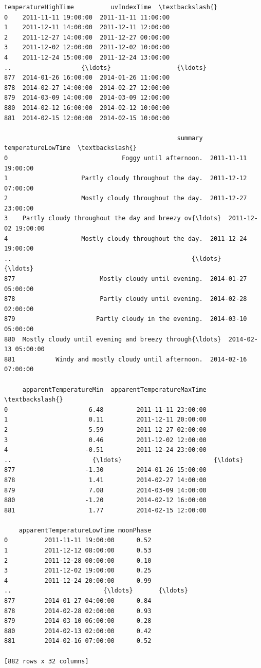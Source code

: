 \documentclass[11pt]{article}
\begin{document}
\begin{tcolorbox}[breakable, size=fbox, boxrule=.5pt, pad at break*=1mm, opacityfill=0]
\begin{Verbatim}[commandchars=\\\{\}]
     temperatureHighTime          uvIndexTime  \textbackslash{}
0    2011-11-11 19:00:00  2011-11-11 11:00:00
1    2011-12-11 14:00:00  2011-12-11 12:00:00
2    2011-12-27 14:00:00  2011-12-27 00:00:00
3    2011-12-02 12:00:00  2011-12-02 10:00:00
4    2011-12-24 15:00:00  2011-12-24 13:00:00
..                   {\ldots}                  {\ldots}
877  2014-01-26 16:00:00  2014-01-26 11:00:00
878  2014-02-27 14:00:00  2014-02-27 12:00:00
879  2014-03-09 14:00:00  2014-03-09 12:00:00
880  2014-02-12 16:00:00  2014-02-12 10:00:00
881  2014-02-15 12:00:00  2014-02-15 10:00:00

                                               summary   temperatureLowTime  \textbackslash{}
0                               Foggy until afternoon.  2011-11-11 19:00:00
1                    Partly cloudy throughout the day.  2011-12-12 07:00:00
2                    Mostly cloudy throughout the day.  2011-12-27 23:00:00
3    Partly cloudy throughout the day and breezy ov{\ldots}  2011-12-02 19:00:00
4                    Mostly cloudy throughout the day.  2011-12-24 19:00:00
..                                                 {\ldots}                  {\ldots}
877                       Mostly cloudy until evening.  2014-01-27 05:00:00
878                       Partly cloudy until evening.  2014-02-28 02:00:00
879                      Partly cloudy in the evening.  2014-03-10 05:00:00
880  Mostly cloudy until evening and breezy through{\ldots}  2014-02-13 05:00:00
881           Windy and mostly cloudy until afternoon.  2014-02-16 07:00:00

     apparentTemperatureMin  apparentTemperatureMaxTime  \textbackslash{}
0                      6.48         2011-11-11 23:00:00
1                      0.11         2011-12-11 20:00:00
2                      5.59         2011-12-27 02:00:00
3                      0.46         2011-12-02 12:00:00
4                     -0.51         2011-12-24 23:00:00
..                      {\ldots}                         {\ldots}
877                   -1.30         2014-01-26 15:00:00
878                    1.41         2014-02-27 14:00:00
879                    7.08         2014-03-09 14:00:00
880                   -1.20         2014-02-12 16:00:00
881                    1.77         2014-02-15 12:00:00

    apparentTemperatureLowTime moonPhase
0          2011-11-11 19:00:00      0.52
1          2011-12-12 08:00:00      0.53
2          2011-12-28 00:00:00      0.10
3          2011-12-02 19:00:00      0.25
4          2011-12-24 20:00:00      0.99
..                         {\ldots}       {\ldots}
877        2014-01-27 04:00:00      0.84
878        2014-02-28 02:00:00      0.93
879        2014-03-10 06:00:00      0.28
880        2014-02-13 02:00:00      0.42
881        2014-02-16 07:00:00      0.52

[882 rows x 32 columns]
\end{Verbatim}
\end{tcolorbox}
        
\end{document}
